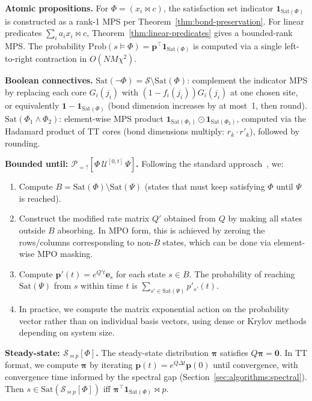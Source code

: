 \documentclass[11pt]{article}
\newcommand{\Sat}{\mathrm{Sat}}
\newcommand{\Prob}{\mathrm{Prob}}
\newcommand{\calS}{\mathcal{S}}
\begin{document}
\medskip
\noindent\textbf{Atomic propositions.}
For $\Phi = (x_i \bowtie c)$, the satisfaction set indicator
$\mathbf{1}_{\Sat(\Phi)}$ is constructed as a rank-1 MPS per
Theorem~\ref{thm:bond-preservation}.
For linear predicates $\sum_i a_i x_i \bowtie c$,
Theorem~\ref{thm:linear-predicates} gives a bounded-rank MPS.
The probability $\Prob(s \models \Phi) = \mathbf{p}^\top \mathbf{1}_{\Sat(\Phi)}$
is computed via a single left-to-right contraction in $O(NM\chi^2)$.

\medskip
\noindent\textbf{Boolean connectives.}
$\Sat(\neg\Phi) = \calS \setminus \Sat(\Phi)$: complement the indicator
MPS by replacing each core $G_i(j_i)$ with
$(1 - f_i(j_i))G_i(j_i)$ at one chosen site, or equivalently
$\mathbf{1} - \mathbf{1}_{\Sat(\Phi)}$ (bond dimension increases by
at most~1, then round).
$\Sat(\Phi_1 \wedge \Phi_2)$: element-wise MPS product
$\mathbf{1}_{\Sat(\Phi_1)} \odot \mathbf{1}_{\Sat(\Phi_2)}$,
computed via the Hadamard product of TT cores
(bond dimensions multiply: $r_k \cdot r'_k$), followed by rounding.

\medskip
\noindent\textbf{Bounded until: $\mathcal{P}_{=?}[\Phi\,\mathcal{U}^{[0,t]}\,\Psi]$.}
Following the standard approach~\cite{baier2003}, we:
\begin{enumerate}[itemsep=1pt]
\item Compute $B = \Sat(\Phi) \setminus \Sat(\Psi)$ (states that
  must keep satisfying $\Phi$ until $\Psi$ is reached).
\item Construct the modified rate matrix $Q'$ obtained from $Q$ by
  making all states outside $B$ absorbing.
  In MPO form, this is achieved by zeroing the rows/columns
  corresponding to non-$B$ states, which can be done via element-wise
  MPO masking.
\item Compute $\mathbf{p}'(t) = e^{Q't}\mathbf{e}_s$ for each state $s \in B$.
  The probability of reaching $\Sat(\Psi)$ from $s$ within time $t$
  is $\sum_{s' \in \Sat(\Psi)} p'_{s'}(t)$.
\item In practice, we compute the matrix exponential action on the
  probability vector rather than on individual basis vectors,
  using dense or Krylov methods depending on system size.
\end{enumerate}

\medskip
\noindent\textbf{Steady-state: $\mathcal{S}_{\bowtie p}[\Phi]$.}
The steady-state distribution $\boldsymbol{\pi}$ satisfies
$Q\boldsymbol{\pi} = \mathbf{0}$.
In TT format, we compute $\boldsymbol{\pi}$ by iterating
$\mathbf{p}(t) = e^{Q\Delta t}\mathbf{p}(0)$ until convergence,
with convergence time informed by the spectral gap
(Section~\ref{sec:algorithms:spectral}).
Then
$s \in \Sat(\mathcal{S}_{\bowtie p}[\Phi])$ iff
$\boldsymbol{\pi}^\top \mathbf{1}_{\Sat(\Phi)} \bowtie p$.
\end{document}
